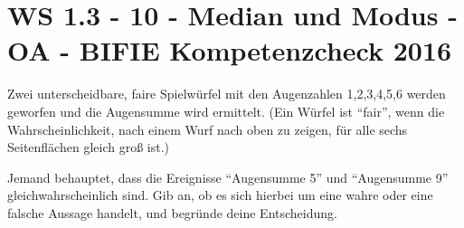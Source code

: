 \section{WS 1.3 - 10 - Median und Modus - OA - BIFIE Kompetenzcheck 2016}

\begin{beispiel}[WS 1.3]{1} %
				Zwei unterscheidbare, faire Spielwürfel mit den Augenzahlen 1,2,3,4,5,6 werden geworfen und die Augensumme wird ermittelt. (Ein Würfel ist "`fair"', wenn die Wahrscheinlichkeit, nach einem Wurf nach oben zu zeigen, für alle sechs Seitenflächen gleich groß ist.)

Jemand behauptet, dass die Ereignisse "`Augensumme 5"' und "`Augensumme 9"' gleichwahrscheinlich sind. Gib an, ob es sich hierbei um eine wahre oder eine falsche Aussage handelt, und begründe deine Entscheidung.\\

\end{beispiel}